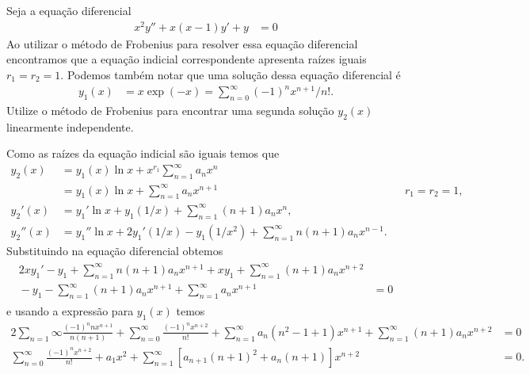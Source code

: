 \documentclass[a4paper,12pt, leqno, answers]{exam}
\begin{document}
\begin{questions}
    \question[E de 2011] Seja a equa\c{c}\~{a}o diferencial
    \begin{align*}
        x^2 y'' + x (x - 1) y' + y &= 0
    \end{align*}
    Ao utilizar o m\'{e}todo de Frobenius para resolver essa equa\c{c}\~{a}o diferencial encontramos que a equa\c{c}\~{a}o indicial correspondente apresenta ra\'{i}zes iguais $r_1 = r_2 = 1$. Podemos tamb\'{e}m notar que uma solu\c{c}\~{a}o dessa equa\c{c}\~{a}o diferencial \'{e}
    \begin{align*}
        y_1(x) &= x \exp(-x) = \sum_{n = 0}^\infty (-1)^n x^{n + 1} / n!.
    \end{align*}
    Utilize o m\'{e}todo de Frobenius para encontrar uma segunda solu\c{c}\~{a}o $y_2(x)$ linearmente independente.
    \begin{solution}
        Como as ra\'{i}zes da equa\c{c}\~{a}o indicial s\~{a}o iguais temos que
        \begin{align*}
            y_2(x) &= y_1(x) \ln x + x^{r_1} \sum_{n = 1}^\infty a_n x^n \\
            &= y_1(x) \ln x + \sum_{n = 1}^\infty a_n x^{n + 1} && r_1 = r_2 = 1, \\
            y_2'(x) &= y_1' \ln x + y_1 (1/x) + \sum_{n = 1}^\infty (n + 1) a_n x^n, \\
            y_2''(x) &= y_1'' \ln x + 2 y_1' (1/x) - y_1 (1/x^2) + \sum_{n = 1}^\infty n (n + 1) a_n x^{n - 1}.
        \end{align*}
        Substituindo na equa\c{c}\~{a}o diferencial obtemos
        \begin{align*}
            \begin{split}
                2 x y_1' - y_1 + \sum_{n = 1}^\infty n (n + 1) a_n x^{n + 1} + x y_1 + \sum_{n = 1}^\infty (n + 1) a_n x^{n + 2} & \\
                {}- y_1 - \sum_{n = 1}^\infty (n + 1) a_n x^{n + 1} + \sum_{n = 1}^\infty a_n x^{n + 1} &= 0
            \end{split}
        \end{align*}
        e usando a express\~{a}o para $y_1(x)$ temos
        \begin{align*}
            2 \sum_{n = 1}\infty \frac{(-1)^n n x^{n + 1}}{n (n + 1)} + \sum_{n = 0}^\infty \frac{(-1)^n x^{n + 2}}{n!} + \sum_{n = 1}^\infty a_n (n^2 - 1 + 1) x^{n + 1} + \sum_{n = 1}^\infty (n + 1) a_n x^{n + 2} &= 0 \\
            \sum_{n = 0}^\infty \frac{(-1)^n x^{n + 2}}{n!} + a_1 x^2 + \sum_{n = 1}^\infty \left[ a_{n + 1} (n + 1)^2 + a_n (n + 1) \right] x^{n + 2} &= 0.

\end{align*}
\end{solution}
\end{questions}
\end{document}
